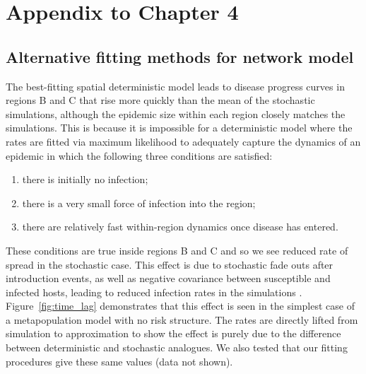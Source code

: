 \chapter{Appendix to Chapter 4\label{app:mle_sse}}

\section{Alternative fitting methods for network model}

The best-fitting spatial deterministic model leads to disease progress curves in regions B and C that rise more quickly than the mean of the stochastic simulations, although the epidemic size within each region closely matches the simulations. This is because it is impossible for a deterministic model where the rates are fitted via maximum likelihood to adequately capture the dynamics of an epidemic in which the following three conditions are satisfied:
\begin{enumerate}
\item{}there is initially no infection;
\item{}there is a very small force of infection into the region;
\item{}there are relatively fast within-region dynamics once disease has entered.
\end{enumerate}
These conditions are true inside regions B and C and so we see reduced rate of spread in the stochastic case. This effect is due to stochastic fade outs after introduction events, as well as negative covariance between susceptible and infected hosts, leading to reduced infection rates in the simulations \cite[pp.~227--229 and pp.~238--240]{keeling_modeling_2008}. Figure~\ref{fig:time_lag} demonstrates that this effect is seen in the simplest case of a metapopulation model with no risk structure. The rates are directly lifted from simulation to approximation to show the effect is purely due to the difference between deterministic and stochastic analogues. We also tested that our fitting procedures give these same values (data not shown).

